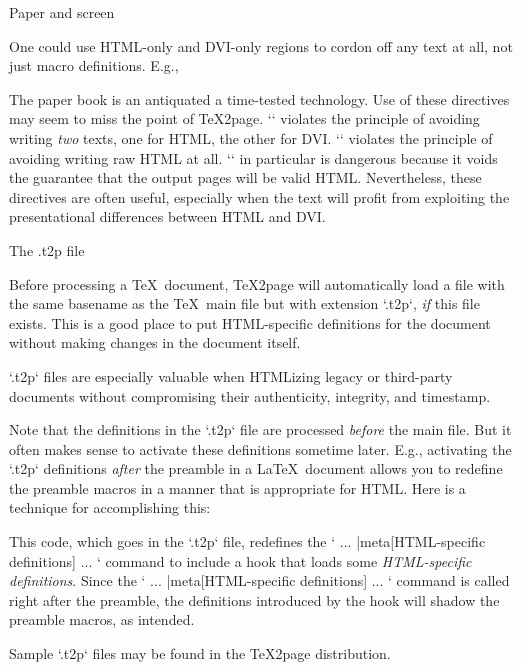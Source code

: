 \beginsection Paper and screen

One could use HTML-only and DVI-only regions to cordon off
any text at all, not just macro definitions.  E.g.,

\begintt
The paper book is
\ifx\shipout\UnDeFiNeD %
an antiquated
\else %
a time-tested
\fi
technology.
\endtt
Use of these directives may seem to miss the point of
\TeX2page.  `\ifx\shipout\UnDeFiNeD` violates the
principle of avoiding  writing {\em two} texts, one
for HTML, the other for DVI.  `\rawhtml` violates the
principle of avoiding writing raw HTML at all.
`\rawhtml` in particular is dangerous because it voids
the guarantee that the output pages will be valid HTML.
Nevertheless, these directives are often useful, especially when the
text will profit from exploiting the presentational differences between
HTML and DVI.

\beginsection The {.t2p} file

%
Before processing a \TeX\ document, \TeX2page will
automatically load a file
with the same basename as the \TeX\ main file but with
extension `.t2p`, {\em if} this file exists.  This
is a good place to put HTML-specific definitions for
the document without making  changes in the document
itself.

`.t2p` files are especially valuable when HTMLizing
legacy or third-party documents without compromising
their authenticity, integrity, and timestamp.

Note that the definitions in the `.t2p` file
are processed {\em before} the main file.  But it often
makes sense to activate these definitions sometime
later.  E.g., activating the `.t2p` definitions {\em
after} the preamble in a \LaTeX\ document allows you to
redefine the preamble macros in a manner that is
appropriate for HTML.  Here is a technique for
accomplishing this:

%
\begintt
\let\PRIMdocument\document

\def\document{
  ... |meta[HTML-specific definitions] ...
  \PRIMdocument}
\endtt
%
This code, which goes in the `.t2p` file,
redefines the `\document` command to include a
hook that loads some {\em HTML-specific definitions}.
Since the `\document` command is called right after
the preamble, the definitions introduced by  the hook
will shadow the preamble macros, as intended.

Sample `.t2p` files may be found in the \TeX2page
distribution.

